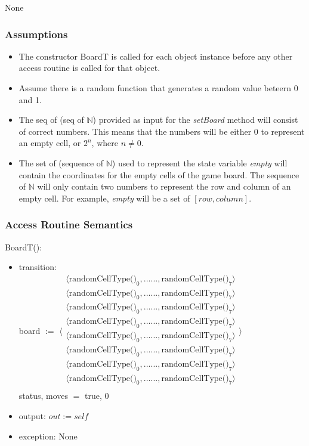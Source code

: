 \documentclass[12pt]{article}
\begin{document}
None

\subsubsection* {Assumptions}

\begin{itemize}
  \item The constructor BoardT is called for each object instance before any other access routine 
  is called for that object. 
  \item Assume there is a random function that generates a random value beteern 0 and 1.
  \item The seq of (seq of $\mathbb{N}$) provided as input for the \textit{setBoard} method will consist of correct numbers. This means that the numbers will be either $0$ to represent an empty cell, or $2^n$, where $n \ne 0$.
  \item The set of (sequence of $\mathbb{N}$) used to represent the state variable \textit{empty} will contain the coordinates for the empty cells of the game board. The sequence of $\mathbb{N}$ will only contain two numbers to represent the row and column of an empty cell. For example, \textit{empty} will be a set of $[row, column]$.
\end{itemize}

\subsubsection* {Access Routine Semantics}

BoardT():
\begin{itemize}
\item transition: \\
      board $:=$ 
      $\langle \begin{array}{c}
      \langle \mbox{randomCellType()}_0, ... ... ,\mbox{randomCellType()}_7 \rangle\\
      \langle \mbox{randomCellType()}_0, ... ... ,\mbox{randomCellType()}_7 \rangle\\
      \langle \mbox{randomCellType()}_0, ... ... ,\mbox{randomCellType()}_7 \rangle\\
      \langle \mbox{randomCellType()}_0, ... ... ,\mbox{randomCellType()}_7 \rangle\\
      \langle \mbox{randomCellType()}_0, ... ... ,\mbox{randomCellType()}_7 \rangle\\
      \langle \mbox{randomCellType()}_0, ... ... ,\mbox{randomCellType()}_7 \rangle\\
      \langle \mbox{randomCellType()}_0, ... ... ,\mbox{randomCellType()}_7 \rangle\\
      \langle \mbox{randomCellType()}_0, ... ... ,\mbox{randomCellType()}_7 \rangle\\
      \end{array} \rangle$ \\ 
      status, moves $=$ true, 0
\item output: $out := \mathit{self}$
\item exception: None
\end{itemize}
\end{document}
